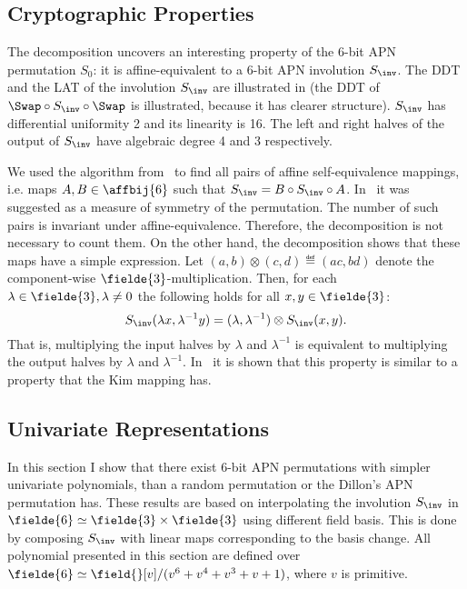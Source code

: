 
\subsection{Cryptographic Properties}
The decomposition uncovers an interesting property of the 6-bit APN permutation $S_0$: it is affine-equivalent to a 6-bit APN involution $S_{\inv}$. The DDT and the LAT of the involution $S_{\inv}$ are illustrated in  (the DDT of $\Swap \circ S_{\inv} \circ \Swap$ is illustrated, because it has clearer structure). $S_{\inv}$ has differential uniformity 2 and its linearity is 16. The left and right halves of the output of $S_{\inv}$ have algebraic degree 4 and 3 respectively.


We used the algorithm from~\cite{LinAffEQ} to find all pairs of affine self-equivalence mappings, i.e. maps $A,B\in\affbij{6}$ such that $S_{\inv} = B \circ S_{\inv} \circ A$. In~\cite{LinAffEQ} it was suggested as a measure of symmetry of the permutation. The number of such pairs is invariant under affine-equivalence. Therefore, the decomposition is not necessary to count them. On the other hand, the decomposition shows that these maps have a simple expression. Let $(a,b)\otimes(c,d) \eqdef (ac, bd)$ denote the component-wise $\fielde{3}$-multiplication. Then, for each $\lambda \in \fielde{3},\lambda \ne 0$ the following holds for all $x,y\in\fielde{3}$:
$$
S_{\inv}(\lambda x, \lambda^{-1}y) = (\lambda, \lambda^{-1}) \otimes S_{\inv}(x,y).
$$
That is, multiplying the input halves by $\lambda$ and $\lambda^{-1}$ is equivalent to multiplying the output halves by $\lambda$ and $\lambda^{-1}$. In~ it is shown that this property is similar to a property that the Kim mapping has.

\subsection{Univariate Representations}

In this section I show that there exist 6-bit APN permutations with simpler univariate polynomials, than a random permutation or the Dillon's APN permutation has. These results are based on interpolating the involution $S_{\inv}$ in $\fielde{6} \simeq \fielde{3} \times \fielde{3}$ using different field basis. This is done by composing $S_{\inv}$ with linear maps corresponding to the basis change. All polynomial presented in this section are defined over $\fielde{6} \simeq \field{}[v]/(v^6 + v^4 + v^3 + v + 1)$, where $v$ is primitive.

